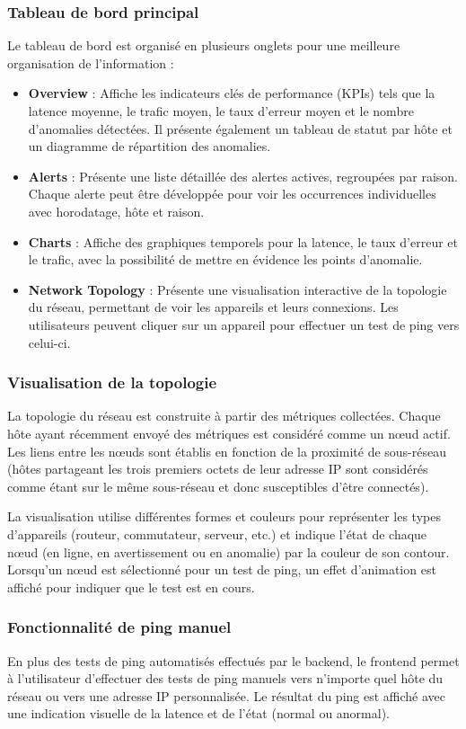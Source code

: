\documentclass[12pt,a4paper]{report}
\begin{document}
\subsubsection{Tableau de bord principal}
Le tableau de bord est organisé en plusieurs onglets pour une meilleure organisation de l'information :
\begin{itemize}
    \item \textbf{Overview} : Affiche les indicateurs clés de performance (KPIs) tels que la latence moyenne, le trafic moyen, le taux d'erreur moyen et le nombre d'anomalies détectées. Il présente également un tableau de statut par hôte et un diagramme de répartition des anomalies.
    \item \textbf{Alerts} : Présente une liste détaillée des alertes actives, regroupées par raison. Chaque alerte peut être développée pour voir les occurrences individuelles avec horodatage, hôte et raison.
    \item \textbf{Charts} : Affiche des graphiques temporels pour la latence, le taux d'erreur et le trafic, avec la possibilité de mettre en évidence les points d'anomalie.
    \item \textbf{Network Topology} : Présente une visualisation interactive de la topologie du réseau, permettant de voir les appareils et leurs connexions. Les utilisateurs peuvent cliquer sur un appareil pour effectuer un test de ping vers celui-ci.
\end{itemize}

\subsubsection{Visualisation de la topologie}
La topologie du réseau est construite à partir des métriques collectées. Chaque hôte ayant récemment envoyé des métriques est considéré comme un nœud actif. Les liens entre les nœuds sont établis en fonction de la proximité de sous-réseau (hôtes partageant les trois premiers octets de leur adresse IP sont considérés comme étant sur le même sous-réseau et donc susceptibles d'être connectés).

La visualisation utilise différentes formes et couleurs pour représenter les types d'appareils (routeur, commutateur, serveur, etc.) et indique l'état de chaque nœud (en ligne, en avertissement ou en anomalie) par la couleur de son contour. Lorsqu'un nœud est sélectionné pour un test de ping, un effet d'animation est affiché pour indiquer que le test est en cours.

\subsubsection{Fonctionnalité de ping manuel}
En plus des tests de ping automatisés effectués par le backend, le frontend permet à l'utilisateur d'effectuer des tests de ping manuels vers n'importe quel hôte du réseau ou vers une adresse IP personnalisée. Le résultat du ping est affiché avec une indication visuelle de la latence et de l'état (normal ou anormal).
\end{document}
